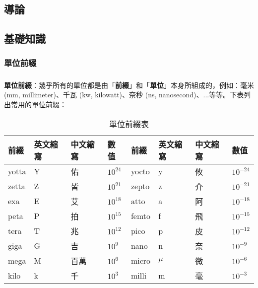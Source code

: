 \documentclass[12pt,a4paper,oneside]{report}
\begin{document}
\begin{CJK}{UTF8}{bkai}

\fi



\chapter{導論}
\section{基礎知識}
\subsection{單位前綴}

% 

\paragraph{}\textbf{單位前綴}：幾乎所有的單位都是由「\textbf{前綴}」和「\textbf{單位}」本身所組成的，例如：毫米 (mm, millimeter)、千瓦 (kw, kilowatt)、奈秒 (ns, nanosecond)、...等等。下表列出常用的單位前綴：

\begin{table}[h!]
\centering
\label{tbl:unit-prefix}
\begin{tabular}{|llll|llll|}
\hline
前綴    & 英文縮寫 & 中文縮寫 & 數值   & 前綴    & 英文縮寫 & 中文縮寫 & 數值    \\
\hline
yotta & Y    & 佑    & $10^{24}$ & yocto & y    & 攸    & $10^{-24}$\\
zetta & Z    & 皆    & $10^{21}$ & zepto & z    & 介    & $10^{-21}$\\
exa   & E    & 艾    & $10^{18}$ & atto  & a    & 阿    & $10^{-18}$\\
peta  & P    & 拍    & $10^{15}$ & femto & f    & 飛    & $10^{-15}$\\
tera  & T    & 兆    & $10^{12}$ & pico  & p    & 皮    & $10^{-12}$\\
giga  & G    & 吉    & $10^{9}$  & nano  & n    & 奈    & $10^{-9}$\\
mega  & M    & 百萬  & $10^{6}$  & micro & $\mu$& 微    & $10^{-6}$\\
kilo  & k    & 千    & $10^{3}$  & milli & m    & 毫    & $10^{-3}$\\
\hline
\end{tabular}
\caption{單位前綴表}
\end{table}


\end{CJK}
\end{document}
